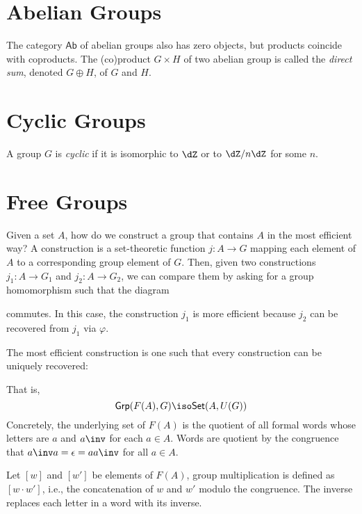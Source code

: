 \documentclass{amsart}
\begin{document}
\section{Abelian Groups}
\label{sec:abelian-groups}

The category $\mathsf{Ab}$ of abelian groups also has zero objects, but products coincide with coproducts.
The (co)product $G \times H$ of two abelian group is called the \emph{direct sum}, denoted $G \oplus H$, of $G$ and $H$.

\section{Cyclic Groups}
\label{sec:cyclic-groups}

\begin{defn}
  A group $G$ is \emph{cyclic} if it is isomorphic to $\dZ$ or to $\dZ/n\dZ$ for some $n$.
\end{defn}

\section{Free Groups}
\label{sec:free-groups}

Given a set $A$, how do we construct a group that contains $A$ in the most efficient way?
A construction is a set-theoretic function $j : A \to G$ mapping each element of $A$ to a corresponding group element of $G$.
Then, given two constructions $j_{1} : A \to G_{1}$ and $j_{2} : A \to G_{2}$, we can compare them by asking for a group homomorphism such that the diagram

commutes.
In this case, the construction $j_{1}$ is more efficient because $j_{2}$ can be recovered from $j_{1}$ via $\varphi$.

The most efficient construction is one such that every construction can be uniquely recovered:
\begin{equation}
  \label{eq:free-group}
  
\end{equation}

That is,
\[
  \mathsf{Grp}(F(A),G) \iso \mathsf{Set}(A,U(G))
\]
Concretely, the underlying set of $F(A)$ is the quotient of all formal words whose letters are $a$ and $a\inv$ for each $a \in A$.
Words are quotient by the congruence that $a\inv a = \epsilon = a a\inv$ for all $a \in A$.

Let $[w]$ and $[w']$ be elements of $F(A)$, group multiplication is defined as $[w \cdot w']$, i.e., the concatenation of $w$ and $w'$ modulo the congruence.
The inverse replaces each letter in a word with its inverse.
\end{document}
